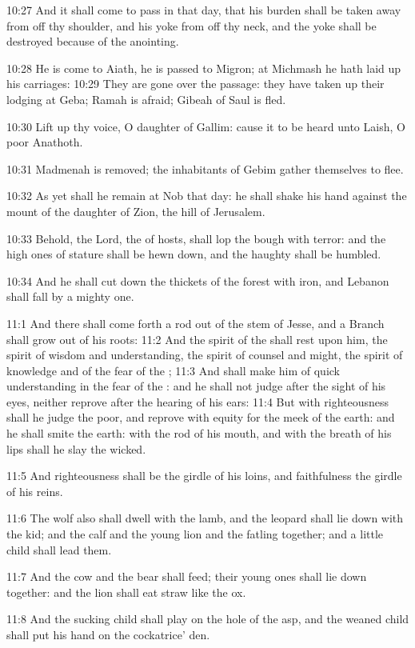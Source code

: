 10:27 And it shall come to pass in that day, that his burden shall be
taken away from off thy shoulder, and his yoke from off thy neck, and
the yoke shall be destroyed because of the anointing.

10:28 He is come to Aiath, he is passed to Migron; at Michmash he hath
laid up his carriages: 10:29 They are gone over the passage: they have
taken up their lodging at Geba; Ramah is afraid; Gibeah of Saul is
fled.

10:30 Lift up thy voice, O daughter of Gallim: cause it to be heard
unto Laish, O poor Anathoth.

10:31 Madmenah is removed; the inhabitants of Gebim gather themselves
to flee.

10:32 As yet shall he remain at Nob that day: he shall shake his hand
against the mount of the daughter of Zion, the hill of Jerusalem.

10:33 Behold, the Lord, the \LORD of hosts, shall lop the bough with
terror: and the high ones of stature shall be hewn down, and the
haughty shall be humbled.

10:34 And he shall cut down the thickets of the forest with iron, and
Lebanon shall fall by a mighty one.

11:1 And there shall come forth a rod out of the stem of Jesse, and a
Branch shall grow out of his roots: 11:2 And the spirit of the \LORD
shall rest upon him, the spirit of wisdom and understanding, the
spirit of counsel and might, the spirit of knowledge and of the fear
of the \LORD; 11:3 And shall make him of quick understanding in the
fear of the \LORD: and he shall not judge after the sight of his eyes,
neither reprove after the hearing of his ears: 11:4 But with
righteousness shall he judge the poor, and reprove with equity for the
meek of the earth: and he shall smite the earth: with the rod of his
mouth, and with the breath of his lips shall he slay the wicked.

11:5 And righteousness shall be the girdle of his loins, and
faithfulness the girdle of his reins.

11:6 The wolf also shall dwell with the lamb, and the leopard shall
lie down with the kid; and the calf and the young lion and the fatling
together; and a little child shall lead them.

11:7 And the cow and the bear shall feed; their young ones shall lie
down together: and the lion shall eat straw like the ox.

11:8 And the sucking child shall play on the hole of the asp, and the
weaned child shall put his hand on the cockatrice' den.

